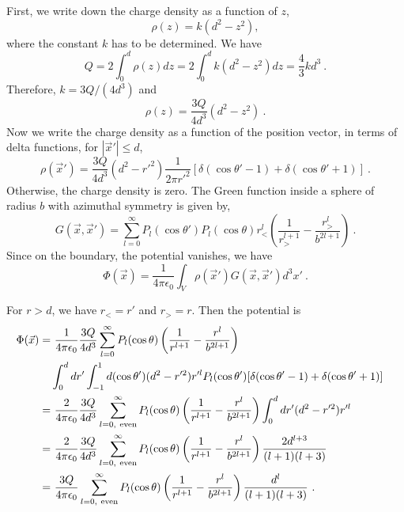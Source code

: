 \documentclass[12pt]{article}
\begin{document}
First, we write down the charge density as a function of $z$,
\begin{equation}
    \rho(z) = k(d^2 - z^2),
\end{equation}
where the constant $k$ has to be determined. We have
\begin{equation}
    Q= 2\int_0^d \rho(z) dz = 2\int_0^d k(d^2 - z^2)dz = \frac{4}{3}k d^3~.
\end{equation}
Therefore, $k = 3 Q /(4 d^3)$ and
\begin{equation}
    \rho(z) = \frac{3Q}{4d^3}(d^2 - z^2)~.
\end{equation}
Now we write the charge density as a function of the position vector, in terms of delta functions, for $|\vec x'| \le d$,
\begin{equation}
    \rho(\vec x') = \frac{3Q}{4d^3}(d^2 - r'^2) \frac{1}{2\pi r'^2} [\delta(\cos \theta' - 1) + \delta(\cos \theta' + 1)]~.
\end{equation}
Otherwise, the charge density is zero.
The Green function inside a sphere of radius $b$ with azimuthal symmetry is given by,
\begin{equation}
    G(\vec x, \vec x') = \sum_{l=0}^\infty P_l(\cos \theta') P_l(\cos \theta) r_<^l \left(\frac{1}{r_>^{l+1}} - \frac{r_>^l}{b^{2l+1}}\right)~.
\end{equation}
Since on the boundary, the potential vanishes, we have
\begin{equation}
    \Phi(\vec x) = \frac{1}{4\pi \epsilon_0} \int_V \rho(\vec x') G(\vec x, \vec x') d^3 x'~.
\end{equation}

For $r > d$, we have $r_< = r'$ and $r_> = r$.
Then the potential is
\begin{align}
    \Phi(\vec x) =&~ \frac{1}{4\pi \epsilon_0}\frac{3 Q}{4d^3}\sum_{l =0}^\infty P_l(\cos\theta) \left(\frac{1}{r^{l+1}} - \frac{r^l}{b^{2l+1}}\right) \cr
    & \int_0^{d}dr' \int_{-1}^1 d(\cos \theta') (d^2 - r'^2)r'^l P_l(\cos \theta')
    [\delta(\cos \theta' -1) + \delta (\cos \theta' + 1)] \cr
    =&~ \frac{2}{4\pi \epsilon_0}\frac{3Q}{4d^3}\sum_{l = 0,~{\rm even}}^\infty P_l(\cos \theta) \left(\frac{1}{r^{l+1}} - \frac{r^l}{b^{2l+1}}\right)  \int_0^d dr'(d^2 - r'^2) r'^l \cr
    =&~ \frac{2}{4\pi \epsilon_0}\frac{3Q}{4d^3}\sum_{l = 0,~{\rm even}}^\infty P_l(\cos \theta) \left(\frac{1}{r^{l+1}} - \frac{r^l}{b^{2l+1}}\right)  \frac{2 d^{l+3}}{(l+1)(l+3)}\cr
    =&~ \frac{3Q}{4\pi \epsilon_0}\sum_{l = 0,~{\rm even}}^\infty P_l(\cos \theta) \left(\frac{1}{r^{l+1}} - \frac{r^l}{b^{2l+1}}\right)  \frac{d^{l}}{(l+1)(l+3)}~.
\end{align}
\end{document}
